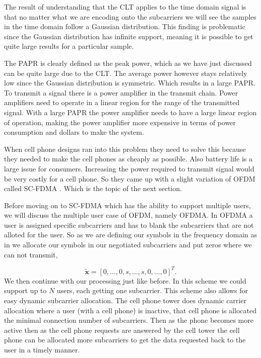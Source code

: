 The result of understanding that the \ac{CLT} applies to the time domain signal is that no matter what we are encoding onto the subcarriers we will see the samples in the time domain follow a Gaussian distribution. This finding is problematic since the Gaussian distribution has infinite support, meaning it is possible to get quite large results for a particular sample.

The \ac{PAPR} is clearly defined as the peak power, which as we have just discussed can be quite large due to the \ac{CLT}. The average power however stays relatively low since the Gaussian distribution is symmetric. Which results in a large \ac{PAPR}. To transmit a signal there is a power amplifier in the transmit chain. Power amplifiers need to operate in a linear region for the range of the transmitted signal. With a large \ac{PAPR} the power amplifier needs to have a large linear region of operation, making the power amplifier more expensive in terms of power consumption and dollars to make the system.

When cell phone designs ran into this problem they need to solve this because they needed to make the cell phones as cheaply as possible. Also battery life is a large issue for consumers. Increasing the power required to transmit signal would be very costly for a cell phone. So they came up with a slight variation of \ac{OFDM} called \ac{SC-FDMA} \cite{LTEBook}. Which is the topic of the next section.

Before moving on to \ac{SC-FDMA} which has the ability to support multiple users, we will discuss the multiple user case of \ac{OFDM}, namely \ac{OFDMA}. In \ac{OFDMA} a user is assigned specific subcarriers and has to blank the subcarriers that are not alloted for the user. So as we are defining our symbols in the frequency domain as in  we allocate our symbols in our negotiated subcarriers and put zeros where we can not transmit,

\begin{equation}
\tilde{\mathbf{x}}=\left[0,\dots,0,s,\dots,s,0,\dots,0\right]^T.
\end{equation}
\noindent
We then continue with our processing just like before. In this scheme we could support up to $N$ users, each getting one subcarrier. This scheme also allows for easy dynamic subcarrier allocation. The cell phone tower does dynamic carrier allocation where a user (with a cell phone) is inactive, that cell phone is allocated the minimal connection number of subcarriers. Then as the phone becomes more active then as the cell phone requests are answered by the cell tower the cell phone can be allocated more subcarriers to get the data requested back to the user in a timely manner. 
	
